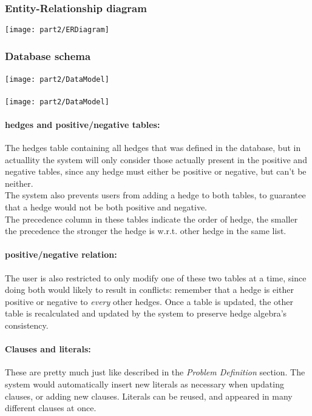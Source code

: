 \documentclass[../gr-final.tex]{subfiles}
\begin{document}
\subsubsection{Entity-Relationship diagram}
\texttt{[image: part2/ERDiagram]}

\subsubsection{Database schema}
\paragraph{}
\texttt{[image: part2/DataModel]}
\paragraph{}
\texttt{[image: part2/DataModel]}
\paragraph{hedges and positive/negative tables:}
The hedges table containing all hedges that was defined in the database, but
in actuallity the system will only consider those actually present in
the positive and negative tables, since any hedge must either be
positive or negative, but can't be neither.\\
The system also prevents users from adding a hedge to both tables, to
guarantee that a hedge would not be both positive and negative.\\
The precedence column in these tables indicate the order of hedge, the
smaller the precedence the stronger the hedge is w.r.t. other hedge in
the same list.
\paragraph{positive/negative relation:}
The user is also restricted to only modify one of these two tables at
a time, since doing both would likely to result in conflicts: remember
that a hedge is either positive or negative to {\em every} other
hedges. 
Once a table is updated, the other table is recalculated and updated
by the system to preserve hedge algebra's consistency.
\paragraph{Clauses and literals:}
These are pretty much just like described in the {\em Problem
  Definition} section. The system would automatically insert new
literals as necessary when updating clauses, or adding new
clauses. Literals can be reused, and appeared in many different
clauses at once. 
\end{document}
